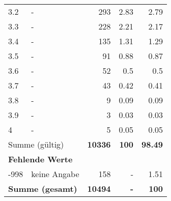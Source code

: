 \begin{longtable}{lXrrr}
        3.2 & \multicolumn{1}{X}{-} & %
          \num{293} &
          \num[round-mode=places,round-precision=2]{2,83} &
          \num[round-mode=places,round-precision=2]{2,79} \\

        3.3 & \multicolumn{1}{X}{-} & %
          \num{228} &
          \num[round-mode=places,round-precision=2]{2,21} &
          \num[round-mode=places,round-precision=2]{2,17} \\

        3.4 & \multicolumn{1}{X}{-} & %
          \num{135} &
          \num[round-mode=places,round-precision=2]{1,31} &
          \num[round-mode=places,round-precision=2]{1,29} \\

        3.5 & \multicolumn{1}{X}{-} & %
          \num{91} &
          \num[round-mode=places,round-precision=2]{0,88} &
          \num[round-mode=places,round-precision=2]{0,87} \\

        3.6 & \multicolumn{1}{X}{-} & %
          \num{52} &
          \num[round-mode=places,round-precision=2]{0,5} &
          \num[round-mode=places,round-precision=2]{0,5} \\

        3.7 & \multicolumn{1}{X}{-} & %
          \num{43} &
          \num[round-mode=places,round-precision=2]{0,42} &
          \num[round-mode=places,round-precision=2]{0,41} \\

        3.8 & \multicolumn{1}{X}{-} & %
          \num{9} &
          \num[round-mode=places,round-precision=2]{0,09} &
          \num[round-mode=places,round-precision=2]{0,09} \\

        3.9 & \multicolumn{1}{X}{-} & %
          \num{3} &
          \num[round-mode=places,round-precision=2]{0,03} &
          \num[round-mode=places,round-precision=2]{0,03} \\

        4 & \multicolumn{1}{X}{-} & %
          \num{5} &
          \num[round-mode=places,round-precision=2]{0,05} &
          \num[round-mode=places,round-precision=2]{0,05} \\

     \midrule
     \multicolumn{2}{l}{Summe (gültig)} &
       \textbf{\num{10336}} &
     \textbf{100} &
       \textbf{\num[round-mode=places,round-precision=2]{98,49}} \\
     \multicolumn{5}{l}{\textbf{Fehlende Werte}}\\
       -998 &
       keine Angabe &
         \num{158} &
        - &
         \num[round-mode=places,round-precision=2]{1,51} \\
     \midrule
     \multicolumn{2}{l}{\textbf{Summe (gesamt)}} &
          \textbf{\num{10494}} &
        \textbf{-} &
        \textbf{100} \\
     \bottomrule
     \end{longtable}
     
